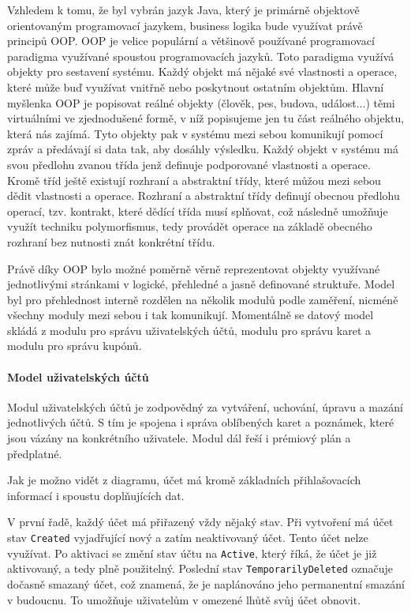 		Vzhledem k tomu, že byl vybrán jazyk Java, který je primárně objektově orientovaným programovací jazykem, business
		logika bude využívat právě principů \ac{OOP}.
		\ac{OOP} je velice populární a většinově používané programovací paradigma využívané spoustou programovacích
		jazyků.
		Toto paradigma využívá objekty pro sestavení systému.
		Každý objekt má nějaké své vlastnosti a operace, které může buď využívat vnitřně nebo poskytnout ostatním
		objektům.
		Hlavní myšlenka \ac{OOP} je popisovat reálné objekty (člověk, pes, budova, událost...) těmi virtuálními ve zjednodušené
		formě, v níž popisujeme jen tu část reálného objektu, která nás zajímá.
		Tyto objekty pak v systému mezi sebou komunikují pomocí zpráv a předávají si data tak, aby dosáhly výsledku.
		Každý objekt v systému má svou předlohu zvanou třída jenž definuje podporované vlastnosti a operace.
		Kromě tříd ještě existují rozhraní a abstraktní třídy, které můžou mezi sebou dědit vlastnosti a operace.
		Rozhraní a abstraktní třídy definují obecnou předlohu operací, tzv. kontrakt, které dědící třída musí splňovat, což
		následně umožňuje využít techniku polymorfismus, tedy provádět operace na základě obecného rozhraní bez nutnosti
		znát konkrétní třídu.
		\cite{oop}

		Právě díky \ac{OOP} bylo možné poměrně věrně reprezentovat objekty využívané jednotlivými stránkami v logické,
		přehledné a jasně definované struktuře.
		Model byl pro přehlednost interně rozdělen na několik modulů podle zaměření, nicméně všechny moduly
		mezi sebou i tak komunikují.
		Momentálně se datový model skládá z modulu pro správu uživatelských účtů, modulu pro správu karet a modulu pro správu
		kupónů.

		\paragraph{Model uživatelských účtů}

		Modul uživatelských účtů je zodpovědný za vytváření, uchování, úpravu a mazání jednotlivých účtů.
		S tím je spojena i správa oblíbených karet a poznámek, které jsou vázány na konkrétního uživatele.
		Modul dál řeší i prémiový plán a předplatné.


		Jak je možno vidět z diagramu, účet má kromě základních přihlašovacích informací i spoustu
		doplňujících dat.

		V první řadě, každý účet má přiřazený vždy nějaký stav.
		Při vytvoření má účet stav \lstinline{Created} vyjadřující nový a zatím neaktivovaný účet.
		Tento účet nelze využívat.
		Po aktivaci se změní stav účtu na \lstinline{Active}, který říká, že účet je již aktivovaný, a tedy plně použitelný.
		Poslední stav \lstinline{TemporarilyDeleted} označuje dočasně smazaný účet, což znamená, že je naplánováno jeho permanentní
		smazání v budoucnu.
		To umožňuje uživatelům v omezené lhůtě svůj účet obnovit.

